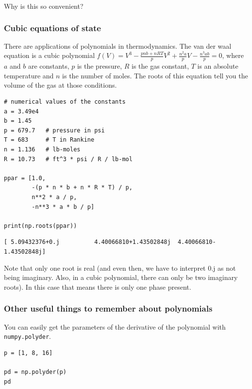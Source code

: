 \documentclass[11pt]{article}
\begin{document}
Why is this so convenient?

\subsubsection{Cubic equations of state}
\label{sec:org2fa9a0c}

There are applications of polynomials in thermodynamics. The van der waal equation is a cubic polynomial \(f(V) = V^3 - \frac{p n b + n R T}{p} V^2 + \frac{n^2 a}{p}V - \frac{n^3 a b}{p} = 0\), where \(a\) and \(b\) are constants, \(p\) is the pressure, \(R\) is the gas constant, \(T\) is an absolute temperature and \(n\) is the number of moles. The roots of this equation tell you the volume of the gas at those conditions.

\begin{verbatim}
# numerical values of the constants
a = 3.49e4
b = 1.45
p = 679.7   # pressure in psi
T = 683     # T in Rankine
n = 1.136   # lb-moles
R = 10.73   # ft^3 * psi / R / lb-mol

ppar = [1.0,
        -(p * n * b + n * R * T) / p,
        n**2 * a / p,
        -n**3 * a * b / p]

print(np.roots(ppar))
\end{verbatim}

\begin{verbatim}
[ 5.09432376+0.j          4.40066810+1.43502848j  4.40066810-1.43502848j]

\end{verbatim}

Note that only one root is real (and even then, we have to interpret 0.j as not being imaginary. Also, in a cubic polynomial, there can only be two imaginary roots). In this case that means there is only one phase present.

\subsubsection{Other useful things to remember about polynomials}
\label{sec:org6cae4a5}

You can easily get the parameters of the derivative of the polynomial with \texttt{numpy.polyder}.

\begin{verbatim}
p = [1, 8, 16]

pd = np.polyder(p)
pd
\end{verbatim}
\end{document}
